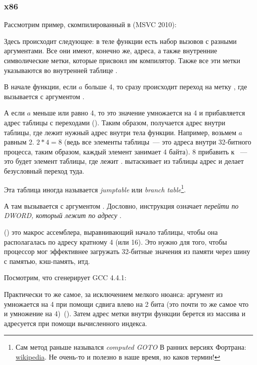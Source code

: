 \subsubsection{x86}


Рассмотрим пример, скомпилированный в (MSVC 2010):



Здесь происходит следующее: в теле функции есть набор вызовов \printf с разными аргументами. 
Все они имеют, конечно же, адреса, а также внутренние символические метки, которые присвоил им компилятор.
Также все эти метки указываются во внутренней таблице .

В начале функции, если $a$ больше 4, то сразу происходит переход на метку , 
где вызывается \printf с аргументом .

А если $a$ меньше или равно 4, то это значение умножается на 4 и прибавляется адрес таблицы 
с переходами (). 
Таким образом, получается адрес внутри таблицы, где лежит нужный адрес внутри тела функции. 
Например, возьмем $a$ равным 2. $2*4 = 8$ (ведь все элементы таблицы~--- это адреса внутри 32-битного процесса, 
таким образом, каждый элемент занимает 4 байта). 8 прибавить к ~--- это будет элемент таблицы,
где лежит . \JMP вытаскивает из таблицы адрес  и делает безусловный переход туда.

Эта таблица иногда называется \emph{jumptable} или
\emph{branch table}\footnote{Сам метод раньше назывался 
\emph{computed GOTO} В ранних версиях Фортрана:
\href{http://en.wikipedia.org/wiki/Branch_table}{wikipedia}.
Не очень-то и полезно в наше время, но каков термин!}.

А там вызывается \printf с аргументом . 
Дословно, инструкция  
означает \emph{перейти по DWORD, который лежит по адресу} .

 () это макрос ассемблера, выравнивающий начало таблицы, 
чтобы она располагалась по адресу кратному 4 (или 16).
Это нужно для того, чтобы процессор мог эффективнее загружать 32-битные 
значения из памяти через шину с памятью, кэш-память, итд.



\label{switch_lot_GCC}

Посмотрим, что сгенерирует GCC 4.4.1:



Практически то же самое, за исключением мелкого нюанса: аргумент из  умножается на 4 
при помощи сдвига влево на 2 бита (это почти то же самое что и умножение на 4)~().
Затем адрес метки внутри функции берется из массива  и адресуется при помощи 
вычисленного индекса.

